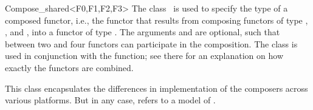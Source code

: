 \begin{ccRefClass}{Compose_shared<F0,F1,F2,F3>}
  \ccDefinition The class \ccRefName\ is used to specify the type of a
  composed functor, i.e., the functor that results from composing
  functors of type , , and , into a functor of
  type . The arguments  and  are optional,
  such that between two and four functors can participate in the
  composition. The class is used in conjunction with the
   function; see there for an explanation on how
  exactly the functors are combined.

  
  \ccTypes
  
   This class encapsulates the differences in
  implementation of the composers across various platforms. But in any
  case,  refers to a model of .

  \ccSeeAlso
  \\
  
\end{ccRefClass}

